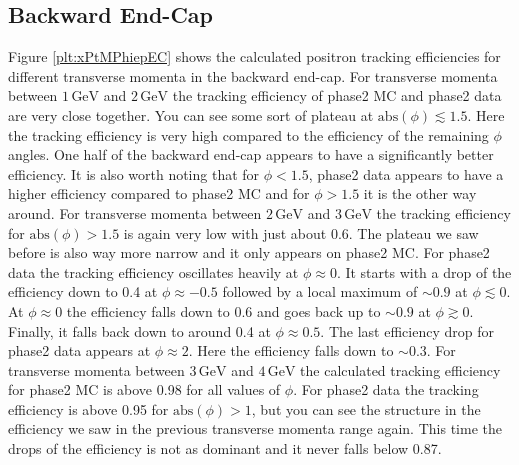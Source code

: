 \documentclass[a4paper,11pt,twosided,final,german,openbib,pdftex,listof=totoc,bibliography=totoc]{scrbook}
\begin{document}
\newpage





\subsection{Backward End-Cap}


Figure \ref{plt:xPtMPhiepEC} shows the calculated positron tracking efficiencies for different transverse momenta in the backward end-cap. 
For transverse momenta between $1\,\textrm{GeV}$ and $2\,\textrm{GeV}$ the tracking efficiency of phase2 MC and phase2 data are very close together. You can see some sort of plateau at $\textrm{abs}(\phi) \lesssim 1.5$. Here the tracking efficiency is very high compared to the efficiency of the remaining $\phi$ angles. One half of the backward end-cap appears to have a significantly better efficiency. It is also worth noting that for $\phi <1.5$, phase2 data appears to have a higher efficiency compared to phase2 MC and for $\phi > 1.5$ it is the other way around. 
For transverse momenta between $2\,\textrm{GeV}$ and $3\,\textrm{GeV}$ the tracking efficiency for $\textrm{abs}(\phi) >1.5$ is again very low with just about 0.6. The plateau we saw before is also way more narrow and it only appears on phase2 MC. For phase2 data the tracking efficiency oscillates heavily at $\phi \approx 0$. It starts with a drop of the efficiency down to 0.4 at $\phi \approx -0.5$ followed by a local maximum of $\sim 0.9$ at $\phi \lesssim 0$. At $\phi \approx 0 $ the efficiency falls down to 0.6 and goes back up to $\sim 0.9$ at $\phi \gtrsim 0$. Finally, it falls back down to around 0.4 at $\phi \approx 0.5$. The last efficiency drop for phase2 data appears at $\phi \approx 2$. Here the efficiency falls down to $\sim 0.3$. 
For transverse momenta between $3\,\textrm{GeV}$ and $4\,\textrm{GeV}$ the calculated tracking efficiency for phase2 MC is above 0.98 for all values of $\phi$. For phase2 data the tracking efficiency is above 0.95 for $\textrm{abs}(\phi) > 1$, but you can see the structure in the efficiency we saw in the previous transverse momenta range again. This time the drops of the efficiency is not as dominant and it never falls below 0.87.
\end{document}
